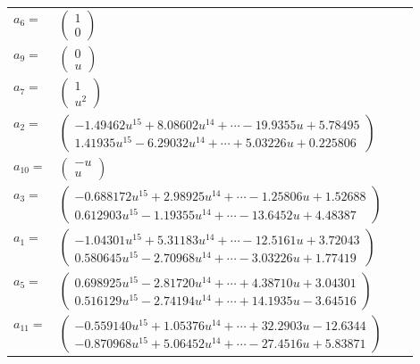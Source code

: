\documentclass[1p]{elsarticle_modified}
\theoremstyle{definition}
\begin{document}
\begin{tabular}{m{7pt} m{180pt} m{7pt} m{180pt} }
\flushright $a_{6}=$&$\begin{pmatrix}1\\0\end{pmatrix}$ \\
\flushright $a_{9}=$&$\begin{pmatrix}0\\u\end{pmatrix}$ \\
\flushright $a_{7}=$&$\begin{pmatrix}1\\u^2\end{pmatrix}$ \\
\flushright $a_{2}=$&$\begin{pmatrix}-1.49462 u^{15}+8.08602 u^{14}+\cdots-19.9355 u+5.78495\\1.41935 u^{15}-6.29032 u^{14}+\cdots+5.03226 u+0.225806\end{pmatrix}$ \\
\flushright $a_{10}=$&$\begin{pmatrix}- u\\u\end{pmatrix}$ \\
\flushright $a_{3}=$&$\begin{pmatrix}-0.688172 u^{15}+2.98925 u^{14}+\cdots-1.25806 u+1.52688\\0.612903 u^{15}-1.19355 u^{14}+\cdots-13.6452 u+4.48387\end{pmatrix}$ \\
\flushright $a_{1}=$&$\begin{pmatrix}-1.04301 u^{15}+5.31183 u^{14}+\cdots-12.5161 u+3.72043\\0.580645 u^{15}-2.70968 u^{14}+\cdots-3.03226 u+1.77419\end{pmatrix}$ \\
\flushright $a_{5}=$&$\begin{pmatrix}0.698925 u^{15}-2.81720 u^{14}+\cdots+4.38710 u+3.04301\\0.516129 u^{15}-2.74194 u^{14}+\cdots+14.1935 u-3.64516\end{pmatrix}$ \\
\flushright $a_{11}=$&$\begin{pmatrix}-0.559140 u^{15}+1.05376 u^{14}+\cdots+32.2903 u-12.6344\\-0.870968 u^{15}+5.06452 u^{14}+\cdots-27.4516 u+5.83871\end{pmatrix}$ \\

\end{tabular}
\end{document}
